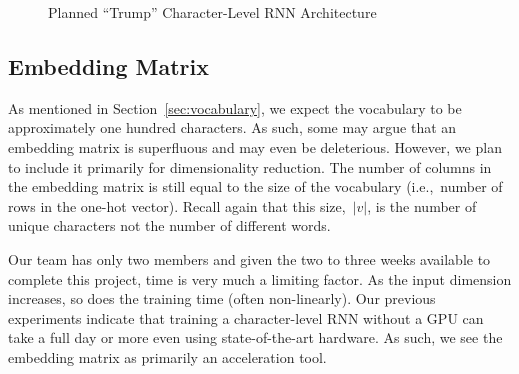 \documentclass{report}
\begin{document}
\begin{figure}
    \vspace{0.3em} 
    \caption{Planned ``Trump'' Character-Level RNN Architecture}\label{fig:trumpLearnerArchitecture}
  \end{figure}

  \subsection{Embedding Matrix}

  As mentioned in Section~\ref{sec:vocabulary}, we expect the vocabulary to be approximately one hundred characters.  As such, some may argue that an embedding matrix is superfluous and may even be deleterious.  However, we plan to include it primarily for dimensionality reduction.  The number of columns in the embedding matrix is still equal to the size of the vocabulary (i.e.,~number of rows in the one-hot vector).  Recall again that this size,~$|v|$, is the number of unique characters not the number of different words.
  
  Our team has only two members and given the two to three weeks available to complete this project, time is very much a limiting factor.  As the input dimension increases, so does the training time (often non-linearly).  Our previous experiments indicate that training a character-level RNN without a GPU can take a full day or more even using state-of-the-art hardware.  As such, we see the embedding matrix as primarily an acceleration tool.
  
\end{document}
